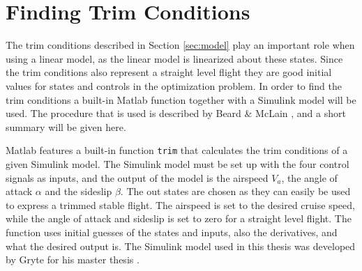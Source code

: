 \section[Trim Conditions]{Finding Trim Conditions}

The trim conditions described in Section \ref{sec:model} play an important role when using a linear model, as the linear model is linearized about these states. Since the trim conditions also represent a straight level flight they are good initial values for states and controls in the optimization problem. In order to find the trim conditions a built-in Matlab function together with a Simulink model will be used. The procedure that is used is described by Beard \& McLain \cite{uavBEARD}, and a short summary will be given here.

Matlab features a built-in function \texttt{trim} that calculates the trim conditions of a given Simulink model. The Simulink model must be set up with the four control signals as inputs, and the output of the model is the airspeed $V_a$, the angle of attack $\alpha$ and the sideslip $\beta$. The out states are chosen as they can easily be used to express a trimmed stable flight. The airspeed is set to the desired cruise speed, while the angle of attack and sideslip is set to zero for a straight level flight. The function uses initial guesses of the states and inputs, also the derivatives, and what the desired output is. The Simulink model used in this thesis was developed by Gryte for his master thesis \cite{GRYTE}.